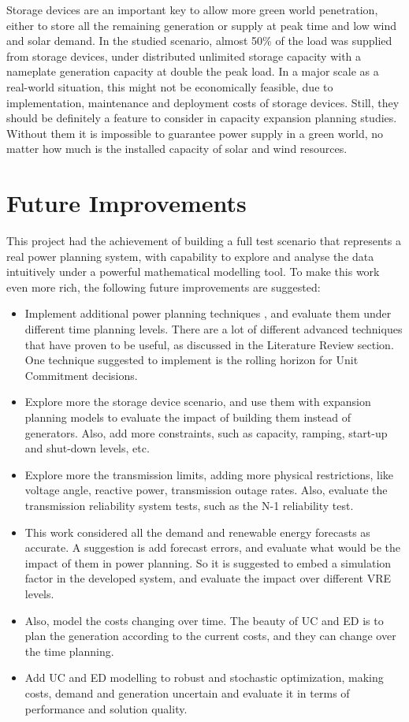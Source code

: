 \documentclass[12pt,LUDisStyle,twosided]{book}
\begin{document}
Storage devices are an important key to allow more green world penetration, either to store all the remaining generation or supply at peak time and low wind and solar demand. In the studied scenario, almost 50\% of the load was supplied from storage devices, under distributed unlimited storage capacity with a nameplate generation capacity at double the peak load. In a major scale as a real-world situation, this might not be economically feasible, due to implementation, maintenance and deployment costs of storage devices. Still, they should be definitely a feature to consider in capacity expansion planning studies. Without them it is impossible to guarantee power supply in a green world, no matter how much is the installed capacity of solar and wind resources.

\section{Future Improvements}

This project had the achievement of building a full test scenario that represents a real power planning system, with capability to explore and analyse the data intuitively under a powerful mathematical modelling tool. To make this work even more rich, the following future improvements are suggested:

\begin{itemize}
\item Implement additional power planning techniques , and evaluate them under different time planning levels. There are a lot of different advanced techniques that have proven to be useful, as discussed in the Literature Review section. One technique suggested to implement is the rolling horizon for Unit Commitment decisions.
\item Explore more the storage device scenario, and use them with expansion planning models to evaluate the impact of building them instead of generators. Also, add more constraints, such as capacity, ramping, start-up and shut-down levels, etc.
\item Explore more the transmission limits, adding more physical restrictions, like voltage angle, reactive power, transmission outage rates. Also, evaluate the transmission reliability system tests, such as the N-1 reliability test.
\item This work considered all the demand and renewable energy forecasts as accurate. A suggestion is add forecast errors, and evaluate what would be the impact of them in power planning. So it is suggested to embed a simulation factor in the developed system, and evaluate the impact over different VRE levels.
\item Also, model the costs changing over time. The beauty of UC and ED is to plan the generation according to the current costs, and they can change over the time planning.
\item Add UC and ED modelling to robust and stochastic optimization, making costs, demand and generation uncertain and evaluate it in terms of performance and solution quality.

\end{itemize}



\nocite{*}



\end{document}
